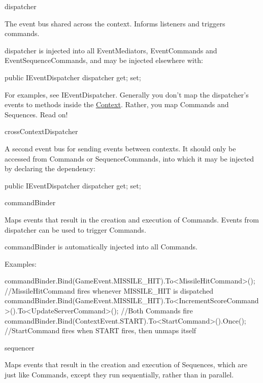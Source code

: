 \begin{DoxyItemize}
\item dispatcher

The event bus shared across the context. Informs listeners and triggers commands.

{\ttfamily dispatcher} is injected into all Event\-Mediators, Event\-Commands and Event\-Sequence\-Commands, and may be injected elsewhere with\-: \begin{DoxyVerb}
public IEventDispatcher dispatcher{ get; set;}
\end{DoxyVerb}


For examples, see I\-Event\-Dispatcher. Generally you don't map the dispatcher's events to methods inside the \hyperlink{classstrange_1_1extensions_1_1context_1_1impl_1_1_context}{Context}. Rather, you map Commands and Sequences. Read on!


\item cross\-Context\-Dispatcher

A second event bus for sending events between contexts. It should only be accessed from Commands or Sequence\-Commands, into which it may be injected by declaring the dependency\-: \begin{DoxyVerb}
public IEventDispatcher dispatcher{ get; set;}
\end{DoxyVerb}



\item command\-Binder

Maps events that result in the creation and execution of Commands. Events from dispatcher can be used to trigger Commands.

{\ttfamily command\-Binder} is automatically injected into all Commands.

Examples\-: \begin{DoxyVerb}commandBinder.Bind(GameEvent.MISSILE_HIT).To<MissileHitCommand>(); //MissileHitCommand fires whenever MISSILE_HIT is dispatched
commandBinder.Bind(GameEvent.MISSILE_HIT).To<IncrementScoreCommand>().To<UpdateServerCommand>(); //Both Commands fire
commandBinder.Bind(ContextEvent.START).To<StartCommand>().Once(); //StartCommand fires when START fires, then unmaps itself
\end{DoxyVerb}



\item sequencer

Maps events that result in the creation and execution of Sequences, which are just like Commands, except they run sequentially, rather than in parallel.


\end{DoxyItemize}
